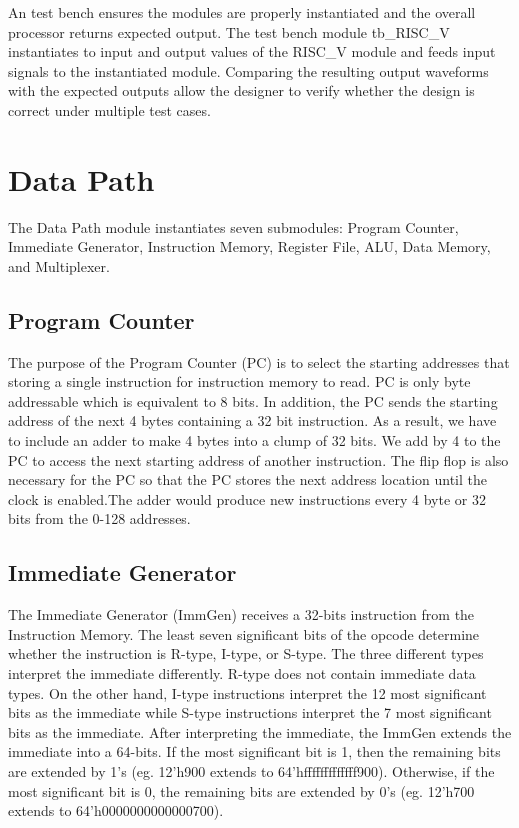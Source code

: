 \documentclass{article}
\begin{document}
An test bench ensures the modules are properly instantiated and the overall processor returns expected output. The test bench module tb\_RISC\_V instantiates to input and output values of the RISC\_V module and feeds input signals to the instantiated module. Comparing the resulting output waveforms with the expected outputs allow the designer to verify whether the design is correct under multiple test cases.


\section{Data Path}
The Data Path module instantiates seven submodules: Program Counter, Immediate Generator, Instruction Memory, Register File, ALU, Data Memory, and Multiplexer. 

\subsection{Program Counter}

The purpose of the Program Counter (PC) is to select the starting addresses that storing a single instruction for instruction memory to read. PC is only byte addressable which is equivalent to 8 bits. In addition, the PC sends the starting address of the next 4 bytes containing a 32 bit instruction. As a result, we have to include an adder to make 4 bytes into a clump of 32 bits. We add by 4 to the PC to access the next starting address of another instruction. The flip flop is also necessary for the PC so that the PC stores the next address location until the clock is enabled.The adder would produce new instructions every 4 byte or 32 bits from the 0-128 addresses.

\subsection{Immediate Generator}
The Immediate Generator (ImmGen) receives a 32-bits instruction from the Instruction Memory. The least seven significant bits of the opcode determine whether the instruction is R-type, I-type, or S-type. The three different types interpret the immediate differently. R-type does not contain immediate data types. On the other hand, I-type instructions interpret the 12 most significant bits as the immediate while S-type instructions interpret the 7 most significant bits as the immediate. After interpreting the immediate, the ImmGen extends the immediate into a 64-bits. If the most significant bit is 1, then the remaining bits are extended by 1's (eg. 12'h900 extends to 64'hfffffffffffff900). Otherwise, if the most significant bit is 0, the remaining bits are extended by 0's (eg. 12'h700 extends to 64'h0000000000000700).
\end{document}
